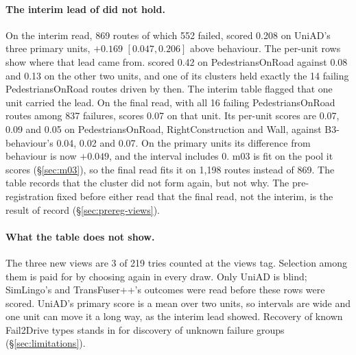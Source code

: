 \paragraph{The interim lead of  did not hold.}
On the interim read, 869 routes of which 552 failed,  scored
0.208 on UniAD's three primary units, $+0.169$ $[0.047, 0.206]$ above
behaviour.
The per-unit rows show where that lead came from.  scored 0.42
on PedestriansOnRoad against 0.08 and 0.13 on the other two units, and one of
its clusters held exactly the 14 failing PedestriansOnRoad routes driven by
then. The interim table flagged that one unit carried the lead.
On the final read, with all 16 failing PedestriansOnRoad routes among 837
failures,  scores 0.07 on that unit. Its per-unit scores are
0.07, 0.09 and 0.05 on PedestriansOnRoad, RightConstruction and Wall, against
B3-behaviour's 0.04, 0.02 and 0.07. On the primary units its difference from
behaviour is now $+0.049$, and the interval includes 0. m03 is fit on the pool
it scores (\S\ref{sec:m03}), so the final read fits it on 1,198 routes instead
of 869. The table records that the cluster did not form again, but not why. The
pre-registration fixed before either read that the final read, not the interim,
is the result of record (\S\ref{sec:prereg-views}).

\paragraph{What the table does not show.}
The three new views are 3 of 219 tries counted at the views tag. Selection
among them is paid for by choosing again in every draw. Only UniAD is blind;
SimLingo's and TransFuser++'s outcomes were read before these rows were scored.
UniAD's primary score is a mean over two units, so intervals are wide and one
unit can move it a long way, as the interim lead showed. Recovery of known
Fail2Drive types stands in for discovery of unknown failure groups
(\S\ref{sec:limitations}).
